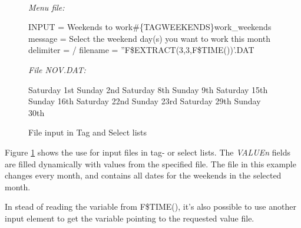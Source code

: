 \documentclass[a4paper]{book}
\renewcommand{\indent}{\hspace*{5mm}}
\begin{document}
\begin{figure}[h!tb]
\begin{minipage}[h!tb]{\textwidth}
\hrulefill \\
\textsl{Menu file:} \newline
\begin{ttfamily}
 \newline
\indent INPUT = Weekends to work{\#}{\{}TAG\textbar WEEKENDS{\}}work{\_}weekends\newline
\noindent[WEEKENDS] \newline
\indent message = Select the weekend day(s) you want to work this month \newline
\indent delimiter = / \newline
\indent filename = ''F{\$}EXTRACT(3,3,F{\$}TIME())'.DAT
\end{ttfamily}

\textsl{File NOV.DAT:} \newline
\begin{ttfamily}
\noindent Saturday 1st \newline
\noindent Sunday 2nd \newline
\noindent Saturday 8th \newline
\noindent Sunday 9th \newline
\noindent Saturday 15th \newline
\noindent Sunday 16th \newline
\noindent Saturday 22nd \newline
\noindent Sunday 23rd \newline
\noindent Saturday 29th \newline
\noindent Sunday 30th \newline
\end{ttfamily}
\caption{File input in Tag and Select lists}\label{fig:listfromfile}
\hrulefill
\end{minipage}
\end{figure}

Figure \ref{fig:listfromfile} shows the use for input files in tag- or select lists. The 
\textsl{VALUE\textit{n}} fields are filled dynamically with values from the specified file. 
The file in this example changes every month, and contains all dates for the 
weekends in the selected month.

In stead of reading the variable from F{\$}TIME(), it's also possible to use 
another input element to get the variable pointing to the requested value 
file.
\end{document}
